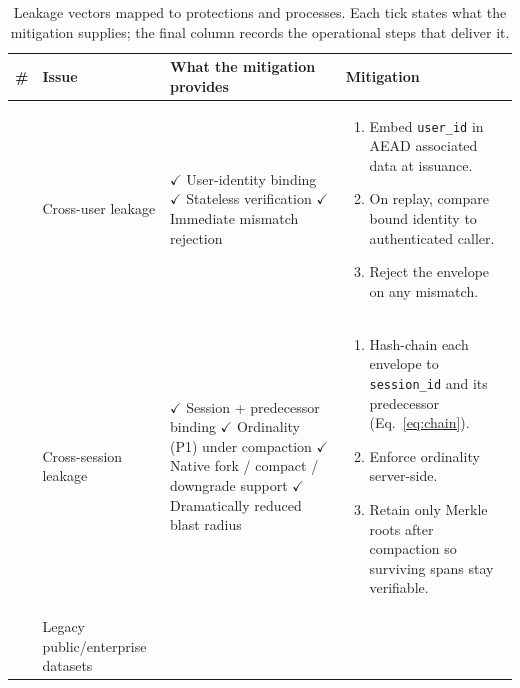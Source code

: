 \begin{table}[H]
\centering
\footnotesize
\renewcommand{\arraystretch}{1.35}
\setlength{\tabcolsep}{4pt}
\caption{Leakage vectors mapped to protections and processes.
Each tick states what the mitigation supplies; the final
column records the operational steps that deliver it.}
\label{tab:defense-summary}
\begin{tabular}{@{}
  >{\centering\arraybackslash}p{}
  >{\raggedright\arraybackslash}p{}
  >{\raggedright\arraybackslash}p{}
  >{\raggedright\arraybackslash}p{}
  @{}
}
\toprule
\textbf{\#} & \textbf{Issue} & \textbf{What the mitigation provides} & \textbf{Mitigation} \\
\midrule
1 &
Cross-user leakage &
$\checkmark$ User-identity binding \newline
$\checkmark$ Stateless verification \newline
$\checkmark$ Immediate mismatch rejection
&
\begin{enumerate}[topsep=0pt,partopsep=0pt,before=\vspace{-0.55\baselineskip}]
  \item Embed \texttt{user\_id} in AEAD associated data at issuance.
  \item On replay, compare bound identity to authenticated caller.
  \item Reject the envelope on any mismatch.
\end{enumerate} \\
\addlinespace
2 &
Cross-session leakage &
$\checkmark$ Session + predecessor binding \newline
$\checkmark$ Ordinality (P1) under compaction \newline
$\checkmark$ Native fork / compact / downgrade support \newline
$\checkmark$ Dramatically reduced blast radius
&
\begin{enumerate}[topsep=0pt,partopsep=0pt,before=\vspace{-0.55\baselineskip}]
  \item Hash-chain each envelope to \texttt{session\_id} and its
        predecessor (Eq.~\ref{eq:chain}).
  \item Enforce ordinality server-side.
  \item Retain only Merkle roots after compaction so surviving
        spans stay verifiable.
\end{enumerate} \\
\addlinespace
3 &
Legacy public/enterprise datasets &

\end{tabular}
\end{table}
